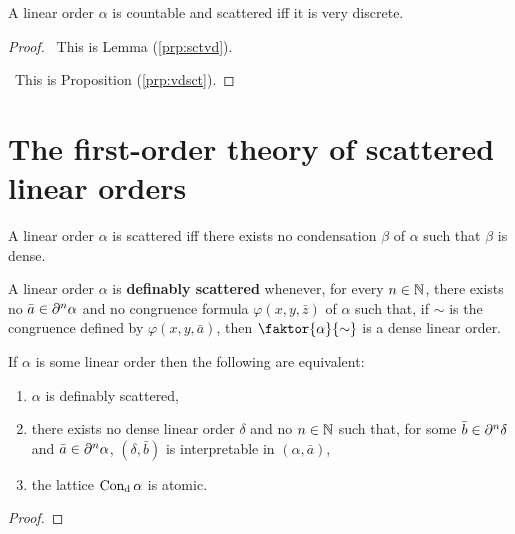 \begin{thm}
	A linear order $\alpha$ is countable and  scattered iff it is very discrete.
\end{thm}
\begin{proof}

	\forward\	This is Lemma (\ref{prp:sctvd}).

	\backward\	This is Proposition (\ref{prp:vdsct}).
\end{proof}


\section{The first-order theory of scattered linear orders}


\begin{prp}
        A linear order $\alpha$ is scattered iff there exists no condensation $\beta$ of $\alpha$ such that $\beta$ is dense.
    \end{prp}

    \begin{dfn}
	    A linear order $\alpha$ is \textbf{definably scattered} whenever, for every $n\in\mathbb{N}$, there exists no $\bar{a}\in\partial^{n}\alpha$ and no congruence formula $\varphi(x,y,\bar{z})$ of $\alpha$ such that, if $\sim$ is the congruence defined by $\varphi(x,y,\bar{a})$, then $\faktor{\alpha}{\sim}$ is a dense linear order.
    \end{dfn}

\begin{prp}
        If $\alpha$ is some linear order then the following are equivalent:
        \begin{enumerate}
            \item   $\alpha$ is definably scattered,
	    \item   there exists no dense linear order $\delta$ and no $n\in\mathbb{N}$ such that, for some $\bar{b}\in\partial^{n}\delta$ and $\bar{a}\in\partial^{n}\alpha$, $(\delta,\bar{b})$ is interpretable in $(\alpha,\bar{a})$,
            \item   the lattice $\operatorname{Con_d}\alpha$ is atomic.
        \end{enumerate}
\end{prp}
    	\begin{proof}

	\end{proof}

